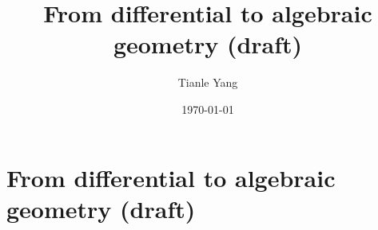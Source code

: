\documentclass{noteformyself}
\title{From differential to algebraic geometry (draft)}
\author{Tianle Yang}
\date{\today}
\begin{document}
    \maketitle
    \section{From differential to algebraic geometry (draft)}




\end{document}
